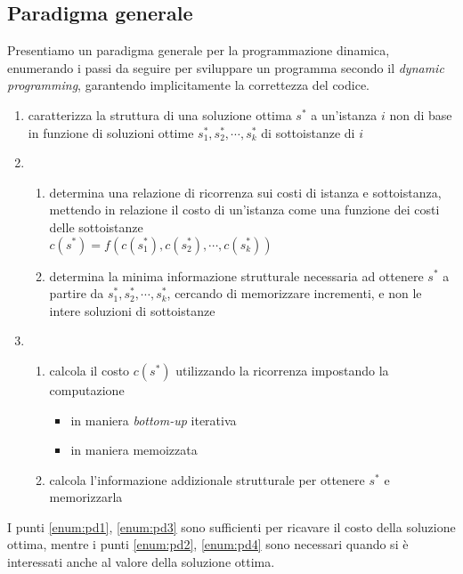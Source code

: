 \subsection{Paradigma generale}

Presentiamo un paradigma generale per la programmazione dinamica, enumerando i passi da seguire per sviluppare un programma secondo il \emph{dynamic programming}, garantendo implicitamente la correttezza del codice.

\begin{enumerate}
    \item caratterizza la struttura di una soluzione ottima $s^*$ a un'istanza $i$ non di base in funzione di soluzioni ottime $s_1^*, s_2^*, \cdots, s_k^*$ di sottoistanze di $i$
    \item
        \begin{enumerate}
            \item determina una relazione di ricorrenza sui costi di istanza e sottoistanza, mettendo in relazione il costo di un'istanza come una funzione dei costi delle sottoistanze \\ $c(s^*)=f\left(c(s_1^*),c(s_2^*),\cdots,c(s_k^*)\right)$
                \label{enum:pd1}
            \item determina la minima informazione strutturale necessaria ad ottenere $s^*$ a partire da $s_1^*, s_2^*, \cdots, s_k^*$, cercando di memorizzare incrementi, e non le intere soluzioni di sottoistanze
                \label{enum:pd2}
        \end{enumerate}
    \item
        \begin{enumerate}
            \item calcola il costo $c(s^*)$ utilizzando la ricorrenza impostando la computazione
                \begin{itemize}
                    \item in maniera \emph{bottom-up} iterativa
                    \item in maniera memoizzata
                \end{itemize}
                \label{enum:pd3}
            \item calcola l'informazione addizionale strutturale per ottenere $s^*$ e memorizzarla
                \label{enum:pd4}
        \end{enumerate}
\end{enumerate}

I punti \ref{enum:pd1}, \ref{enum:pd3} sono sufficienti per ricavare il costo della soluzione ottima,
mentre i punti \ref{enum:pd2}, \ref{enum:pd4} sono necessari quando si è interessati anche al valore della soluzione ottima.

